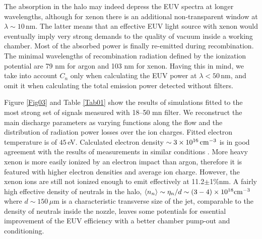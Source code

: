 \documentclass[aip, apl, amsmath,amssymb, reprint]{revtex4-1}
\def\eband{11.2$\pm$1\%\;nm\;}
\begin{document}
The absorption in the halo may indeed depress the EUV spectra at longer wavelengths, although for xenon there is an additional non-transparent window at $\lambda\sim10\,$nm. The latter means that an effective EUV light source with xenon would eventually imply very strong demands to the quality of vacuum inside a working chamber. Most of the absorbed power is finally re-emitted during recombination. The minimal wavelengths of recombination radiation defined by the ionization potential are 79 nm for argon and 103 nm for xenon. Having this in mind, we take into account $C_n$ only when calculating the EUV power at $\lambda<50\,$nm, and omit it when calculating the total emission power detected without filters. 


Figure \ref{Fig03} and Table \ref{Tab01} show the results of simulations fitted to the most strong set of signals measured with 18--50 mn filter. 
We reconstruct the main discharge parameters as varying functions along the flow and the distribution of radiation power losses over the ion charges. Fitted electron temperature is of $45\,$eV. Calculated electron density $\sim 3\times10^{16}\,\rm{cm}^{-3}$ is in good agreement with the results of measurements in similar conditions \cite{sidorov_pop_2016}. More heavy xenon is more easily ionized by an electron impact than argon, therefore it is featured with higher electron densities and average ion charge. However, the xenon ions are still not ionized enough to emit effectively at \eband. 
A fairly high effective density of neutrals in the halo, $\langle n_n\rangle\sim\eta_n/d\sim(3-4)\times10^{18}\rm{cm}^{-3}$ where $d\sim 150\,\mu$m is a characteristic transverse size of the jet, comparable to the density of neutrals inside the nozzle, leaves some potentials for essential improvement of the EUV efficiency with a better chamber pump-out and conditioning.
\end{document}
